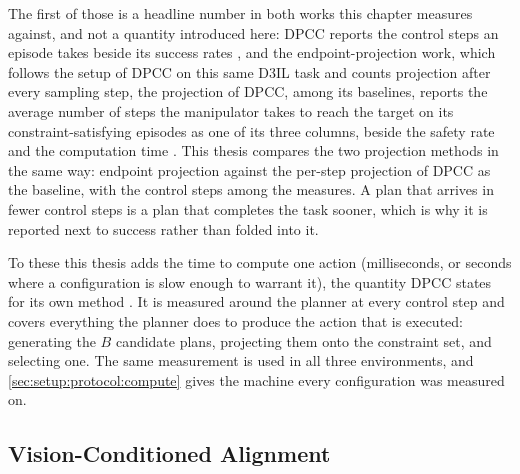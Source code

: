 The first of those is a headline number in both works this chapter measures against, and not a
quantity introduced here: \ac{DPCC} reports the control steps an episode takes beside its success
rates \parencite[Sec.~6.1]{romer2025diffusion}, and the endpoint-projection work, which follows the setup of
\ac{DPCC} on this same D3IL task and counts projection after every sampling step, the projection of \ac{DPCC},
among its baselines, reports the average number of steps the manipulator takes to reach the target on its
constraint-satisfying episodes as one of its three columns, beside the safety rate and the computation time
\parencite[Sec.~VII-A, Table~II]{li2025hardflow}. This thesis compares the two projection methods in the same
way: endpoint projection against the per-step projection of \ac{DPCC} as the baseline, with the control steps
among the measures. A plan that arrives in
fewer control steps is a plan that completes the task sooner, which is why it is reported next to
success rather than folded into it.

To these this thesis adds the time to compute one action (milliseconds, or seconds where a
configuration is slow enough to warrant it), the quantity \ac{DPCC} states for its own
method \parencite[Sec.~6]{romer2025diffusion}. It is measured around the planner at every control step
and covers everything the planner does to produce the action that is executed: generating the $B$
candidate plans, projecting them onto the constraint set, and selecting one. The same measurement is
used in all three environments, and
\autoref{sec:setup:protocol:compute} gives the machine every configuration was measured on.

\subsection{Vision-Conditioned Alignment}\label{sec:setup:metrics:aligning}

